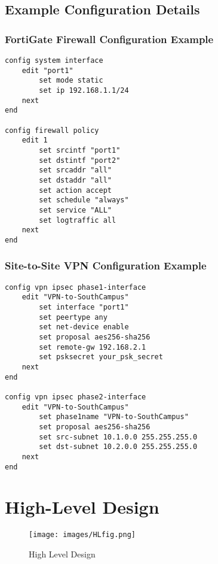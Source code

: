 \documentclass[12pt]{report}
\begin{document}
\subsection{Example Configuration Details}

\subsubsection{FortiGate Firewall Configuration Example} 
\begin{verbatim}
config system interface
    edit "port1"
        set mode static
        set ip 192.168.1.1/24
    next
end

config firewall policy
    edit 1
        set srcintf "port1"
        set dstintf "port2"
        set srcaddr "all"
        set dstaddr "all"
        set action accept
        set schedule "always"
        set service "ALL"
        set logtraffic all
    next
end
\end{verbatim}

\subsubsection{Site-to-Site VPN Configuration Example}
\begin{verbatim}
config vpn ipsec phase1-interface
    edit "VPN-to-SouthCampus"
        set interface "port1"
        set peertype any
        set net-device enable
        set proposal aes256-sha256
        set remote-gw 192.168.2.1
        set psksecret your_psk_secret
    next
end

config vpn ipsec phase2-interface
    edit "VPN-to-SouthCampus"
        set phase1name "VPN-to-SouthCampus"
        set proposal aes256-sha256
        set src-subnet 10.1.0.0 255.255.255.0
        set dst-subnet 10.2.0.0 255.255.255.0
    next
end
\end{verbatim}


\newpage
\section{High-Level Design}
\begin{figure}[h]
    \centering
    \texttt{[image: images/HLfig.png]}
    \caption{High Level Design}
    \label{fig:High Level Design}
\end{figure}
\end{document}
